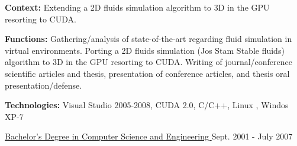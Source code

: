 \begin{cventries}
{\begin{cvitems}
		\item[] {\textbf{Context:} Extending a 2D fluids simulation algorithm to 3D in the GPU resorting to CUDA.}
		\item[] {\textbf{Functions:} Gathering/analysis of state-of-the-art regarding fluid simulation in virtual environments. Porting a 2D fluids simulation (Jos Stam Stable fluids) algorithm to 3D in the GPU resorting to CUDA. Writing of journal/conference scientific articles and thesis, presentation of conference articles, and thesis oral presentation/defense.}
        \item[] {\textbf{Technologies:}  
        \textcolor{rainbowcolor-olive}{Visual Studio 2005-2008},
        \textcolor{rainbowcolor-indigo}{CUDA 2.0}, 
        \textcolor{rainbowcolor-indigo}{C/C++}, 
        \textcolor{rainbowcolor-orange}{Linux %
        }, 
        \textcolor{rainbowcolor-orange}{Windos XP-7}}
      \end{cvitems}
    }
	\hspace{-0.18cm}
  \cventry
    {\href{https://www.ubi.pt/en/course/42}{Bachelor's Degree in Computer Science and Engineering %
    }} %
    {} %
    {} %
    {Sept. 2001 - July 2007} %
    {
    }
\end{cventries}
